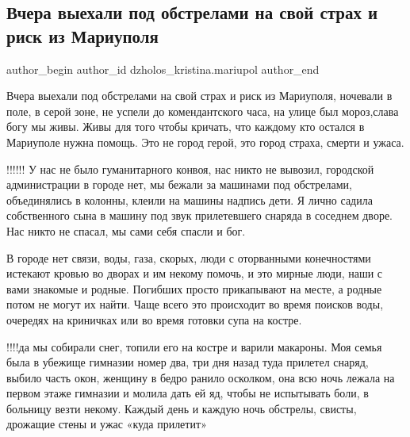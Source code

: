  
 
 
 
 

\subsection{Вчера выехали под обстрелами на свой страх и риск из Мариуполя}
\label{sec:17_03_2022.fb.dzholos_kristina.mariupol.1.vchera_viekhali_pod_}

\ifcmt
 author_begin
   author_id dzholos_kristina.mariupol
 author_end
\fi


Вчера выехали под обстрелами на свой страх и риск из Мариуполя, ночевали в
поле, в серой зоне, не успели до комендантского часа, на улице был мороз,слава
богу мы живы. Живы для того чтобы кричать, что каждому кто остался в Мариуполе
нужна помощь. Это не город герой, это город страха, смерти и ужаса.

!!!!!! У нас не было гуманитарного конвоя, нас никто не вывозил, городской
администрации в городе нет, мы бежали за машинами под обстрелами, объединялись
в колонны, клеили на машины надпись дети. Я лично садила собственного сына в
машину под звук прилетевшего снаряда в соседнем дворе. Нас никто не спасал, мы
сами себя спасли и бог. 

В городе нет связи, воды, газа, скорых, люди с оторванными конечностями
истекают кровью во дворах и им некому помочь, и это мирные люди, наши с вами
знакомые и родные. Погибших просто прикапывают на месте, а родные потом не
могут их найти. Чаще всего это происходит во время поисков воды, очередях на
криничках или во время готовки супа на костре. 

!!!!да мы собирали снег, топили его на костре и варили макароны. Моя семья была
в убежище гимназии номер два, три дня назад туда прилетел снаряд, выбило часть
окон, женщину в бедро ранило осколком, она всю ночь лежала на первом этаже
гимназии и молила дать ей яд, чтобы не испытывать боли, в больницу везти
некому. Каждый день и каждую ночь обстрелы, свисты, дрожащие стены и ужас «куда
прилетит»

